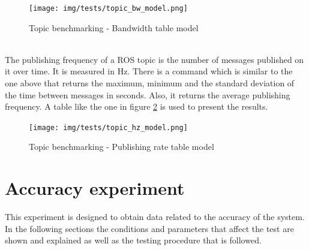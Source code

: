 \begin{itemize}
		\begin{figure}[H]
				\begin{center}
			    \texttt{[image: img/tests/topic\_bw\_model.png]}
				\caption[Topic benchmarking - Bandwidth table model]{Topic benchmarking - Bandwidth table model}
				\end{center}
				\label{topic_bw_model}
		\end{figure}
		\\

		The publishing frequency of a ROS topic is the number of messages published on it over time. 
		It is measured in Hz. 
		There is a command which is similar to the one above that returns the maximum, minimum and the standard deviation of the time between messages in seconds. 
		Also, it returns the average publishing frequency.  
		A table like the one in figure \ref{topic_hz_model} is used to present the results.

		\begin{figure}[H]
				\begin{center}
			    \texttt{[image: img/tests/topic\_hz\_model.png]}
				\caption[Topic benchmarking - Publishing rate table model]{Topic benchmarking - Publishing rate table model}
				\end{center}
				\label{topic_hz_model}
		\end{figure}
			\end{itemize}

\newpage

\section{Accuracy experiment}

	This experiment is designed to obtain data related to the accuracy of the system. 
	In the following sections the conditions and parameters that affect the test are shown and explained as well as the testing procedure that is followed. 



